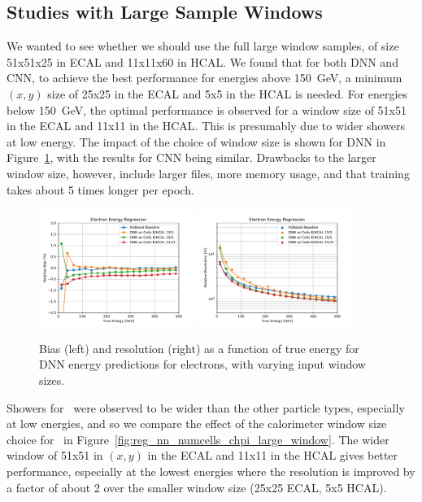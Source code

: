 \subsection*{Studies with Large Sample Windows}

We wanted to see whether we should use the full large window samples, of size 51x51x25 in ECAL and 11x11x60 in HCAL. We found that for both DNN and CNN, to achieve the best performance for energies above 150~GeV, a minimum $(x,y)$ size of 25x25 in the ECAL and 5x5 in the HCAL is needed. For energies below 150~GeV, the optimal performance is observed for a window size of 51x51 in the ECAL and 11x11 in the HCAL. This is presumably due to wider showers at low energy.  The impact of the choice of window size is shown for DNN in Figure~\ref{fig:reg_dnn_numcells}, with the results for CNN being similar.  Drawbacks to the larger window size, however, include larger files, more memory usage, and that training takes about 5 times longer per epoch.

\begin{figure}[htbp]
\centering
\includegraphics[width=0.45\textwidth]{Images/Calo/bias_vs_E_EleFixed_nn_numcells_zoom.pdf}
\includegraphics[width=0.45\textwidth]{Images/Calo/res_vs_E_EleFixed_nn_numcells_fits.pdf}
\caption{Bias (left) and resolution (right) as a function of true energy for DNN energy predictions for electrons, with varying input window sizes.
}
\label{fig:reg_dnn_numcells}
\end{figure}

Showers for \chpi\ were observed to be wider than the other particle types, especially at low energies, and so we compare the effect of the calorimeter window size choice for \chpi\ in Figure~\ref{fig:reg_nn_numcells_chpi_large_window}. The wider window of 51x51 in $(x,y)$ in the ECAL and 11x11 in the HCAL gives better performance, especially at the lowest energies where the resolution is improved by a factor of about 2 over the smaller window size (25x25 ECAL, 5x5 HCAL).


